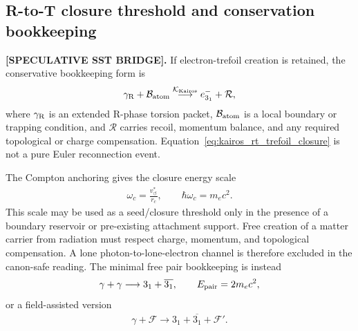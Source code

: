\documentclass[11pt]{article}
\theoremstyle{definition}
\theoremstyle{plain}
\theoremstyle{remark}
\newcommand{\rc}{{r_c}}
\newcommand{\vchar}{v_{\!\boldsymbol{\circlearrowleft}}^{\ast}}
\begin{document}
    \subsection{R-to-T closure threshold and conservation bookkeeping}
        \label{subsec:rt_closure_threshold_bookkeeping}

        \textbf{[SPECULATIVE SST BRIDGE].}
        If electron-trefoil creation is retained, the conservative bookkeeping
        form is
        \begin{align}
            \gamma_{\rm R}
            +
            \mathcal{B}_{\rm atom}
            \overset{\mathcal{K}_{\rm Kairos}}{\longrightarrow}
            e^-_{3_1}
            +
            \mathcal{R},
            \label{eq:kairos_rt_trefoil_closure}
        \end{align}
        where \(\gamma_{\rm R}\) is an extended R-phase torsion packet,
        \(\mathcal{B}_{\rm atom}\) is a local boundary or trapping condition, and
        \(\mathcal{R}\) carries recoil, momentum balance, and any required
        topological or charge compensation. Equation~\eqref{eq:kairos_rt_trefoil_closure}
        is not a pure Euler reconnection event.

        The Compton anchoring gives the closure energy scale
        \begin{align}
            \omega_c = \frac{\vchar}{\rc},
            \qquad
            \hbar\omega_c = m_e c^2.
            \label{eq:compton_closure_energy_scale}
        \end{align}
        This scale may be used as a seed/closure threshold only in the presence
        of a boundary reservoir or pre-existing attachment support. Free creation
        of a matter carrier from radiation must respect charge, momentum, and
        topological compensation. A lone photon-to-lone-electron channel is
        therefore excluded in the canon-safe reading. The minimal free pair
        bookkeeping is instead
        \begin{align}
            \gamma+\gamma
            \longrightarrow
            3_1+\overline{3_1},
            \qquad
            E_{\rm pair}=2m_e c^2,
            \label{eq:trefoil_antitrefoil_pair_bookkeeping}
        \end{align}
        or a field-assisted version
        \begin{align}
            \gamma+\mathcal{F}
            \longrightarrow
            3_1+\overline{3_1}+\mathcal{F}' .
            \label{eq:field_assisted_pair_bookkeeping}
        \end{align}
\end{document}
